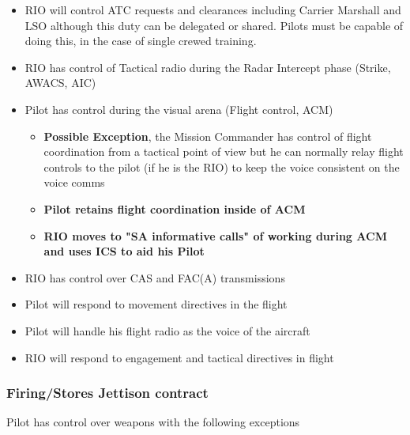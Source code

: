 \begin{itemize}

  \item RIO will control ATC requests and clearances including Carrier Marshall
    and LSO although this duty can be delegated or shared. Pilots must be
    capable of doing this, in the case of single crewed training.

  \item RIO has control of Tactical radio during the Radar Intercept phase
    (Strike, AWACS, AIC)

  \item Pilot has control during the visual arena (Flight control, ACM)

    \begin{itemize}

      \item \textbf{Possible Exception}, the Mission Commander has control of
        flight coordination from a tactical point of view but he can normally
        relay flight controls to the pilot (if he is the RIO) to keep the voice
        consistent on the voice comms

      \item \textbf{Pilot retains flight coordination inside of ACM}

      \item \textbf{RIO moves to "SA informative calls" of working during ACM
        and uses ICS to aid his Pilot}

    \end{itemize}

  \item RIO has control over CAS and FAC(A) transmissions

  \item Pilot will respond to movement directives in the flight

  \item Pilot will handle his flight radio as the voice of the aircraft

  \item RIO will respond to engagement and tactical directives in flight

\end{itemize}

\subsubsection{Firing/Stores Jettison contract}

Pilot has control over weapons with the following exceptions

